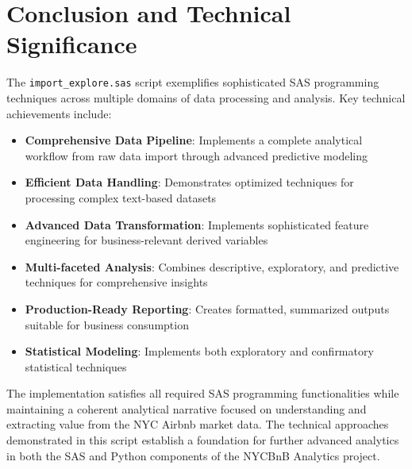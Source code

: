 \documentclass{article}
\begin{document}
\section{Conclusion and Technical Significance}
The \texttt{import\_explore.sas} script exemplifies sophisticated SAS programming techniques across multiple domains of data processing and analysis. Key technical achievements include:

\begin{itemize}[leftmargin=*]
    \item \textbf{Comprehensive Data Pipeline}: Implements a complete analytical workflow from raw data import through advanced predictive modeling
    \item \textbf{Efficient Data Handling}: Demonstrates optimized techniques for processing complex text-based datasets
    \item \textbf{Advanced Data Transformation}: Implements sophisticated feature engineering for business-relevant derived variables
    \item \textbf{Multi-faceted Analysis}: Combines descriptive, exploratory, and predictive techniques for comprehensive insights
    \item \textbf{Production-Ready Reporting}: Creates formatted, summarized outputs suitable for business consumption
    \item \textbf{Statistical Modeling}: Implements both exploratory and confirmatory statistical techniques
\end{itemize}

The implementation satisfies all required SAS programming functionalities while maintaining a coherent analytical narrative focused on understanding and extracting value from the NYC Airbnb market data. The technical approaches demonstrated in this script establish a foundation for further advanced analytics in both the SAS and Python components of the NYCBnB Analytics project.
\end{document}
